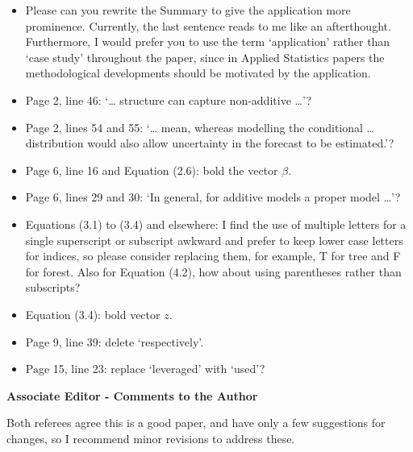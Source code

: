 \documentclass[english, noconfig]{uibklttr}
\newcommand{\section}[1]{{\Large{\textbf{#1}}}}
\begin{document}
\begin{itemize}

\item Please can you rewrite the Summary to give the application more prominence.
Currently, the last sentence reads to me like an afterthought. Furthermore, I
would prefer you to use the term ‘application’ rather than ‘case study’
throughout the paper, since in Applied Statistics papers the methodological
developments should be motivated by the application.

\item Page 2, line 46: ‘… structure can capture non-additive …’?

\item Page 2, lines 54 and 55: ‘… mean, whereas modelling the conditional … distribution would also allow uncertainty in the forecast to be estimated.’?

\item Page 6, line 16 and Equation (2.6): bold the vector $\beta$.

\item Page 6, lines 29 and 30: ‘In general, for additive models a proper model …’?

\item Equations (3.1) to (3.4) and elsewhere: I find the use of multiple letters for a single superscript or subscript awkward and prefer to keep lower case letters for indices, so please consider replacing them, for example, T for tree and F for forest. Also for Equation (4.2), how about using parentheses rather than subscripts?

\item Equation (3.4): bold vector $z$.

\item Page 9, line 39: delete ‘respectively’.

\item Page 15, line 23: replace ‘leveraged’ with ‘used’?

\end{itemize}

\newpage

\section{Associate Editor - Comments to the Author}

Both referees agree this is a good paper, and have only a few suggestions for
changes, so I recommend minor revisions to address these.
\end{document}
